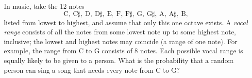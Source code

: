 In music, take the $12$ notes
\[\text{C},\ \text{C}\sharp,\ \text{D},\ \text{D}\sharp,\ \text{E},\ \text{F},\ \text{F}\sharp,\ \text{G},\ \text{G}\sharp,\ \text{A},\ \text{A}\sharp,\ \text{B},\]
listed from lowest to highest, and assume that only this one octave exists. A \emph{vocal range} consists of all the notes from some lowest note up to some highest note, inclusive; the lowest and highest notes may coincide (a range of one note). For example, the range from C to G consists of $8$ notes. Each possible vocal range is equally likely to be given to a person. What is the probability that a random person can sing a song that needs every note from C to G?
